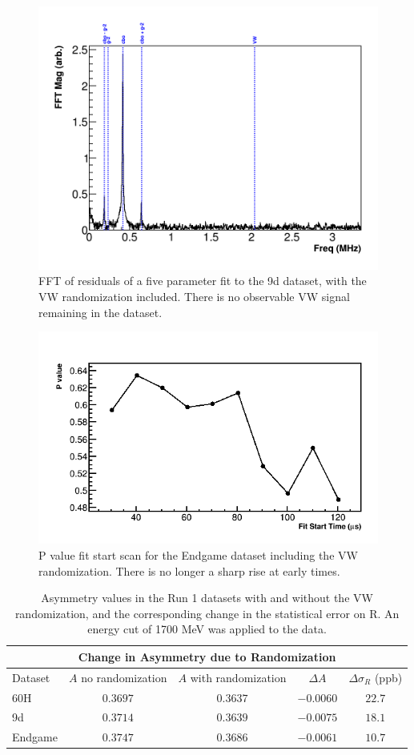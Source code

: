 \documentclass[12pt,letterpaper]{article}
\begin{document}
\begin{figure}[]
    \centering
    \includegraphics[width=.7\textwidth]{FFT_fiveParameter_9d_fVWRand}
    \caption[]{FFT of residuals of a five parameter fit to the 9d dataset, with the VW randomization included. There is no observable VW signal remaining in the dataset.}
    \label{fig:FFT_fiveParam_fVWRand}
\end{figure}

\begin{figure}[]
    \centering
    \includegraphics[width=.7\textwidth]{Pvalue_Endgame_withRand}
    \caption[]{P value fit start scan for the Endgame dataset including the VW randomization. There is no longer a sharp rise at early times.}
    \label{fig:Pval_Endgame_withVWRand}
\end{figure}



\begin{table}[]
\centering
\small
\setlength\tabcolsep{10pt}
\renewcommand{\arraystretch}{1.2}
\begin{tabular*}{1\linewidth}{@{\extracolsep{\fill}}lcccc}
  \hline
    \multicolumn{5}{c}{\textbf{Change in Asymmetry due to Randomization}} \\
  \hline\hline
    Dataset & $A$ no randomization & $A$ with randomization & $\Delta A$ & $\Delta \sigma_{R}$ (ppb) \\
  \hline
    60H & $0.3697$ & $0.3637$ & $-0.0060$ & $22.7$ \\
  \hline
    9d & $0.3714$ & $0.3639$ & $-0.0075$ & $18.1$ \\
  \hline
    Endgame & $0.3747$ & $0.3686$ & $-0.0061$ & $10.7$ \\
  \hline
\end{tabular*}
\caption[]{Asymmetry values in the Run 1 datasets with and without the VW randomization, and the corresponding change in the statistical error on R. An energy cut of 1700 MeV was applied to the data.}
\label{tab:A_change}
\end{table}
\end{document}
